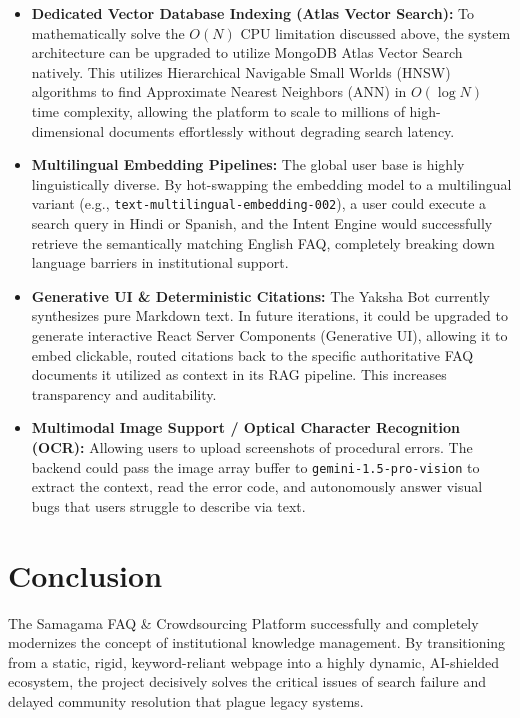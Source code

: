 \documentclass[12pt,a4paper]{article}
\begin{document}
\begin{itemize}
    \item \textbf{Dedicated Vector Database Indexing (Atlas Vector Search):} To mathematically solve the $O(N)$ CPU limitation discussed above, the system architecture can be upgraded to utilize MongoDB Atlas Vector Search natively. This utilizes Hierarchical Navigable Small Worlds (HNSW) algorithms to find Approximate Nearest Neighbors (ANN) in $O(\log N)$ time complexity, allowing the platform to scale to millions of high-dimensional documents effortlessly without degrading search latency.
    
    \item \textbf{Multilingual Embedding Pipelines:} The global user base is highly linguistically diverse. By hot-swapping the embedding model to a multilingual variant (e.g., \texttt{text-multilingual-embedding-002}), a user could execute a search query in Hindi or Spanish, and the Intent Engine would successfully retrieve the semantically matching English FAQ, completely breaking down language barriers in institutional support.
    
    \item \textbf{Generative UI \& Deterministic Citations:} The Yaksha Bot currently synthesizes pure Markdown text. In future iterations, it could be upgraded to generate interactive React Server Components (Generative UI), allowing it to embed clickable, routed citations back to the specific authoritative FAQ documents it utilized as context in its RAG pipeline. This increases transparency and auditability.
    
    \item \textbf{Multimodal Image Support / Optical Character Recognition (OCR):} Allowing users to upload screenshots of procedural errors. The backend could pass the image array buffer to \texttt{gemini-1.5-pro-vision} to extract the context, read the error code, and autonomously answer visual bugs that users struggle to describe via text.
\end{itemize}

\newpage

\section{Conclusion}
\vspace{0.5cm}

The Samagama FAQ \& Crowdsourcing Platform successfully and completely modernizes the concept of institutional knowledge management. By transitioning from a static, rigid, keyword-reliant webpage into a highly dynamic, AI-shielded ecosystem, the project decisively solves the critical issues of search failure and delayed community resolution that plague legacy systems.
\end{document}
